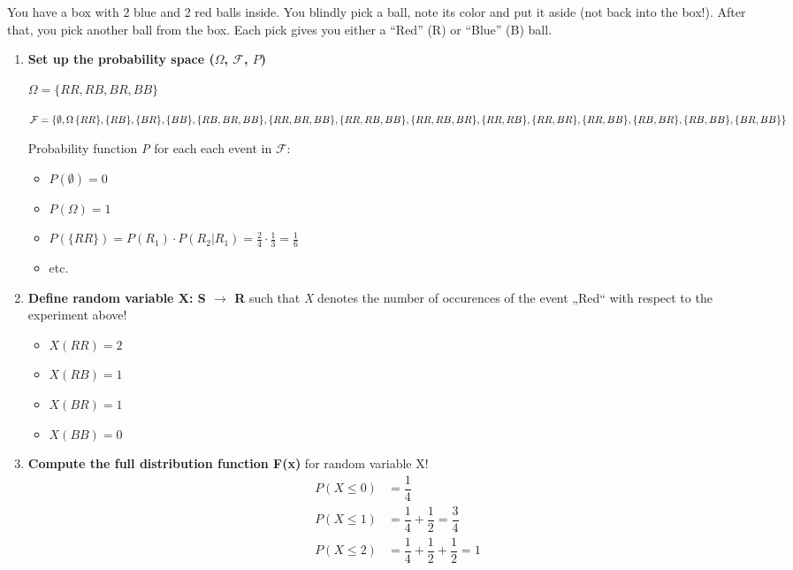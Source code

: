 \documentclass{homework}
\begin{document}
You have a box with 2 blue and 2 red balls inside. You blindly pick a ball, note its color and put it aside (not back into the box!). After that, you pick another ball from the box. Each pick gives you either a “Red” (R) or “Blue” (B) ball.
\begin{enumerate}[label=(\alph*)]
	\item \textbf{Set up the probability space ($\Omega$, $\mathcal{F}$, $P$)}

	$\Omega = \{RR, RB, BR, BB\}$

	$\mathcal{F} = \{\emptyset, \Omega\, \{RR\}, \{RB\}, \{BR\}, \{BB\}, \{RB, BR, BB\}, \{RR, BR, BB\}, \{RR, RB, BB\}, \{RR, RB, BR\},\newline \{RR, RB\}, \{RR, BR\}, \{RR, BB\}, \{RB, BR\}, \{RB, BB\}, \{BR, BB\}\}$
	
	Probability function \emph{P} for each each event in $\mathcal{F}$:
	\begin{itemize}
		\item $P(\emptyset) = 0$
		\item $P(\Omega) = 1$
		\item $P(\{RR\}) = P(R_1)\cdot P(R_2|R_1) = \frac{2}{4}\cdot \frac{1}{3} = \frac{1}{6}$
		\item etc.
	\end{itemize}
	\item \textbf{Define random variable X: S $\rightarrow$ R} such that \emph{X} denotes the number of occurences of the event „Red“ with respect to the experiment above!
	\begin{itemize}
		\item $X(RR) = 2$
		\item $X(RB) = 1$
		\item $X(BR) = 1$
		\item $X(BB) = 0$
	\end{itemize}
\item \textbf{Compute the full distribution function F(x)} for random variable X!
\begin{align*}
P(X\leq0) &= \dfrac{1}{4}\\
P(X\leq1) &= \dfrac{1}{4}+\dfrac{1}{2}=\dfrac{3}{4}\\
P(X\leq2) &= \dfrac{1}{4}+\dfrac{1}{2}+\dfrac{1}{2}=1
\end{align*}

{\centering
{}
\par}
	
\end{enumerate}
\end{document}
